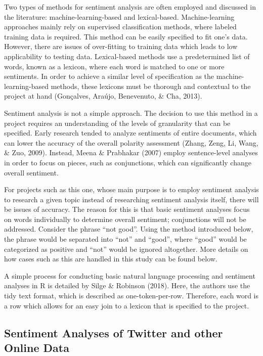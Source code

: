\documentclass[12pt,twoside]{reedthesis}
\begin{document}
Two types of methods for sentiment analysis are often employed and
discussed in the literature: machine-learning-based and lexical-based.
Machine-learning approaches mainly rely on supervised classification
methods, where labeled training data is required. This method can be
easily specified to fit one's data. However, there are issues of
over-fitting to training data which leads to low applicability to
testing data. Lexical-based methods use a predetermined list of words,
known as a lexicon, where each word is matched to one or more
sentiments. In order to achieve a similar level of specification as the
machine-learning-based methods, these lexicons must be thorough and
contextual to the project at hand (Gonçalves, Araújo, Benevenuto, \&
Cha, 2013).

Sentiment analysis is not a simple approach. The decision to use this
method in a project requires an understanding of the levels of
granularity that can be specified. Early research tended to analyze
sentiments of entire documents, which can lower the accuracy of the
overall polarity assessment (Zhang, Zeng, Li, Wang, \& Zuo, 2009).
Instead, Meena \& Prabhakar (2007) employ sentence-level analyses in
order to focus on pieces, such as conjunctions, which can significantly
change overall sentiment.

For projects such as this one, whose main purpose is to employ sentiment
analysis to research a given topic instead of researching sentiment
analysis itself, there will be issues of accuracy. The reason for this
is that basic sentiment analyses focus on words individually to
determine overall sentiment; conjunctions will not be addressed.
Consider the phrase ``not good''. Using the method introduced below, the
phrase would be separated into ``not'' and ``good'', where ``good''
would be categorized as positive and ``not'' would be ignored
altogether. More details on how cases such as this are handled in this
study can be found below.

A simple process for conducting basic natural language processing and
sentiment analyses in R is detailed by Silge \& Robinson (2018). Here,
the authors use the tidy text format, which is described as
one-token-per-row. Therefore, each word is a row which allows for an
easy join to a lexicon that is specified to the project.

\subsection{Sentiment Analyses of Twitter and other Online
Data}\label{sentiment-analyses-of-twitter-and-other-online-data}
\end{document}
